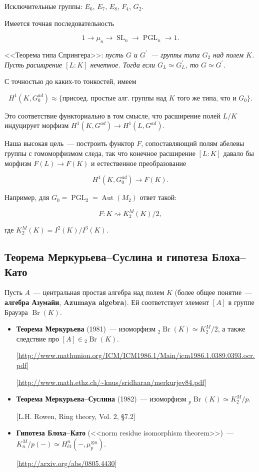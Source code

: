 \documentclass[a4paper]{article}
\DeclareMathOperator{\Br}{Br}
\DeclareMathOperator{\Aut}{Aut}
\DeclareMathOperator{\PGL}{PGL}
\DeclareMathOperator{\SL}{SL}
\newcommand{\term}{\textbf}
\newcommand{\isom}{\simeq}
\theoremstyle{definition}
\begin{document}
Исключительные группы: $E_6$, $E_7$, $E_8$, $F_4$, $G_2$.

Имеется точная последовательность

\[ 1 \to \mu_n \to \SL_n \to \PGL_n \to 1. \]

<<Теорема типа Спрингера>>: \emph{пусть $G$ и $G^\prime$~--- группы типа $G_2$ над полем $K$. Пусть расширение $[L : K]$ нечетное. Тогда если $G_L \isom G_L^\prime$, то $G \isom G^\prime$.}

С точностью до каких-то тонкостей, имеем

\[ H^1 (K, G_0^{ad}) \approx \{\text{присоед. простые алг. группы над }K\text{ того же типа, что и }G_0\}. \]

Это соответствие функториально в том смысле, что расширение полей $L/K$ индуцирует
морфизм $H^1 (K,G^{ad}) \to H^1 (L,G^{ad})$.

Наша высокая цель~--- построить функтор $F$, сопоставляющий полям
абелевы группы с гомоморфизмом следа, так что конечное расширение
$[L:K]$ давало бы морфизм $F(L) \to F(K)$ и естественное
преобразование

\[ H^1 (K,G_0^{ad}) \to F(K). \]

Например, для $G_0 = \PGL_2 = \Aut (M_2)$ ответ такой:

\[ F\colon K \rightsquigarrow K_2^M (K) / 2, \]

\noindent где $K_2^M (K) = I^2(K) / I^3 (K)$.

\subsection{Теорема Меркурьева--Суслина и гипотеза Блоха--Като}

Пусть $A$~--- центральная простая алгебра над полем $K$ (более общее
понятие~--- \term{алгебра Азумайи}, \term{Azumaya algebra}). Ей
соответствует элемент $[A]$ в группе Брауэра $\Br (K)$.

\begin{itemize}
\item \textbf{Теорема Меркурьева} (1981)~--- изоморфизм ${}_2 \Br(K)
  \isom K_2^M / 2$, а также следствие про $[A] \in {}_2 \Br(K)$.

[\url{http://www.mathunion.org/ICM/ICM1986.1/Main/icm1986.1.0389.0393.ocr.pdf}]

[\url{http://www.math.ethz.ch/~knus/sridharan/merkurjev84.pdf}]

\item \textbf{Теорема Меркурьева--Суслина} (1982)~--- изоморфизм ${}_p
  \Br(K) \isom K_2^M / p$.

[L.H. Rowen, Ring theory, Vol. 2, \S 7.2]

\item \textbf{Гипотеза Блоха--Като} (<<norm residue isomorphism
  theorem>>)~--- $K_n^M/p (-) \isom H^n_\text{ét} (-, \mu_p^{\otimes
    n})$.

[\url{http://arxiv.org/abs/0805.4430}]
\end{itemize}
\end{document}
